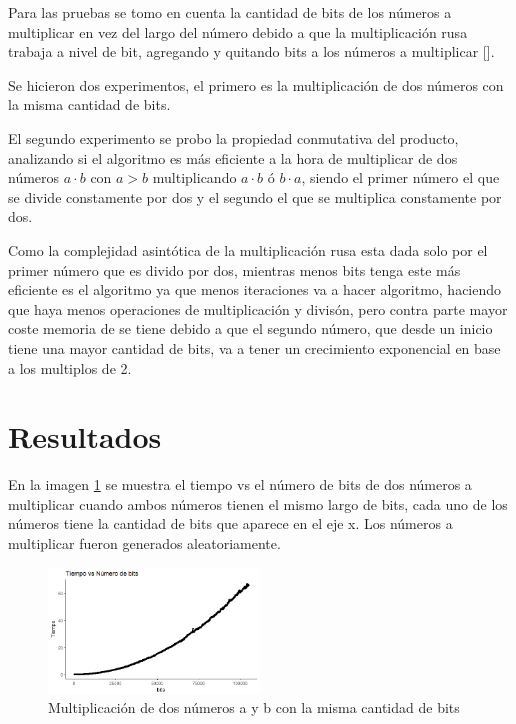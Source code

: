 \documentclass[10pt,journal,compsoc]{IEEEtran}
\begin{document}
Para las pruebas se tomo en cuenta la cantidad de bits de los números a multiplicar en vez del largo del número debido a que la multiplicación rusa trabaja a nivel de bit, agregando y quitando bits a los números a multiplicar [\cite{AL14}].

Se hicieron dos experimentos, el primero es la multiplicación de dos números con la misma cantidad de bits.

El segundo experimento se probo la propiedad conmutativa del producto, analizando si el algoritmo  es más eficiente a la hora de multiplicar de dos números $a\cdot b$ con  $a > b$ multiplicando  $a \cdot b$ ó $b \cdot a$, siendo el primer número el que se divide constamente por dos y el segundo el que se multiplica constamente por dos.

Como la complejidad asintótica de la multiplicación rusa esta dada solo por el primer número que es divido por dos, mientras menos bits tenga este más eficiente es el algoritmo ya que menos iteraciones va a hacer algoritmo, haciendo que haya menos operaciones de multiplicación y divisón, pero contra parte mayor coste memoria de se tiene debido a que el segundo número, que desde un inicio tiene  una mayor cantidad de bits, va a tener un crecimiento exponencial en base a los multiplos de 2. 



\section{Resultados}

En la imagen \ref{fig:result1} se muestra el tiempo vs el número de bits de dos números a multiplicar cuando ambos números tienen el mismo largo de bits, cada uno de los números tiene la cantidad de bits que aparece en el eje x. Los números a multiplicar fueron generados aleatoriamente.

\begin{figure}[!h]
    \centering
    \includegraphics[width=0.5\textwidth]{result1}
    \caption{Multiplicación de dos números a y b con la misma cantidad de bits}
    \label{fig:result1}
\end{figure}
\end{document}
